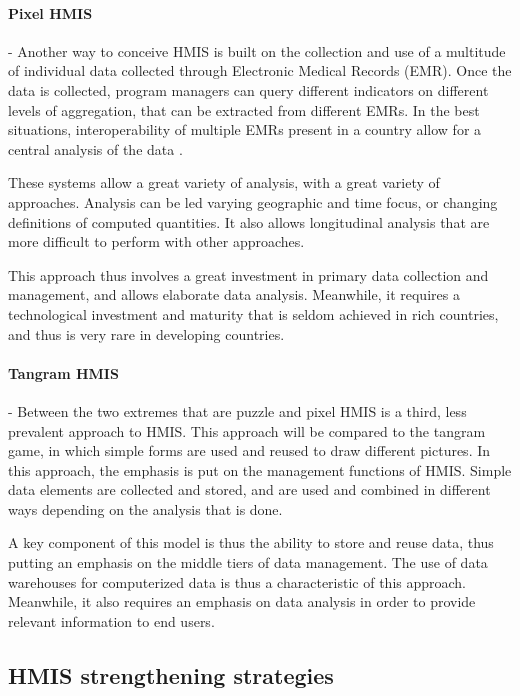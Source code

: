 \documentclass[a4paper,11pt,draft,twoside]{article}
\begin{document}
\paragraph{Pixel HMIS} - Another way to conceive HMIS is built on the collection and use of a multitude of individual data collected through Electronic Medical Records (EMR). Once the data is collected, program managers can query different indicators on different levels of aggregation, that can be extracted from different EMRs. In the best situations, interoperability of multiple EMRs present in a country allow for a central analysis of the data \cite{pugliese2009large}.

These systems allow a great variety of analysis, with a great variety of approaches. Analysis can be led varying geographic and time focus, or changing definitions of computed quantities. It also allows longitudinal analysis that are more difficult to perform with other approaches.

This approach thus involves a great investment in primary data collection and management, and allows elaborate data analysis. Meanwhile, it requires a technological investment and maturity that is seldom achieved in rich countries, and thus is very rare in developing countries.

\paragraph{Tangram HMIS} - Between the two extremes that are puzzle and pixel HMIS is a third, less prevalent approach to HMIS. This approach will be compared to the tangram game, in which simple forms are used and reused to draw different pictures. In this approach, the emphasis is put on the management functions of HMIS. Simple data elements are collected and stored, and are used and combined in different ways depending on the analysis that is done.

A key component of this model is thus the ability to store and reuse data, thus putting an emphasis on the middle tiers of data management. The use of data warehouses for computerized data is thus a characteristic of this approach. Meanwhile, it also requires an emphasis on data analysis in order to provide relevant information to end users.

    \subsection{HMIS strengthening strategies}
\end{document}
